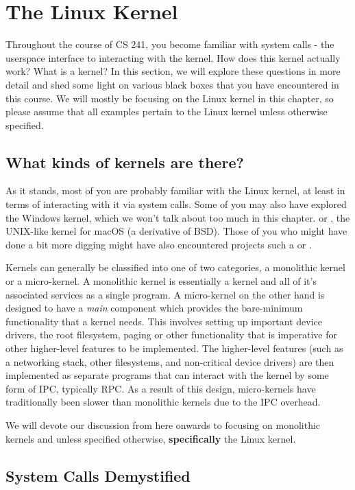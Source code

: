 \section{The Linux Kernel}

Throughout the course of CS 241, you become familiar with system calls - the userspace interface to interacting with the kernel.
How does this kernel actually work? What is a kernel?
In this section, we will explore these questions in more detail and shed some light on various black boxes that you have encountered in this course.
We will mostly be focusing on the Linux kernel in this chapter, so please assume that all examples pertain to the Linux kernel unless otherwise specified.

\subsection{What kinds of kernels are there?}

As it stands, most of you are probably familiar with the Linux kernel, at least in terms of interacting with it via system calls.
Some of you may also have explored the Windows kernel, which we won't talk about too much in this chapter.
or , the UNIX-like kernel for macOS (a derivative of BSD).
Those of you who might have done a bit more digging might have also encountered projects such a  or .

Kernels can generally be classified into one of two categories, a monolithic kernel or a micro-kernel. A monolithic
kernel is essentially a kernel and all of it's associated services as a single program. A micro-kernel on the other hand
is designed to have a \textit{main} component which provides the bare-minimum functionality that a kernel needs. This
involves setting up important device drivers, the root filesystem, paging or other functionality that is imperative for
other higher-level features to be implemented. The higher-level features (such as a networking stack, other filesystems,
and non-critical device drivers) are then implemented as separate programs that can interact with the kernel by some
form of IPC, typically RPC. As a result of this design, micro-kernels have traditionally been slower than monolithic
kernels due to the IPC overhead.

We will devote our discussion from here onwards to focusing on monolithic kernels and unless specified otherwise,
\textbf{specifically} the Linux kernel.

\subsection{System Calls Demystified}

